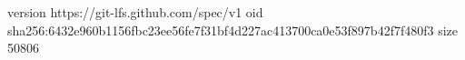 version https://git-lfs.github.com/spec/v1
oid sha256:6432e960b1156fbc23ee56fe7f31bf4d227ac413700ca0e53f897b42f7f480f3
size 50806
